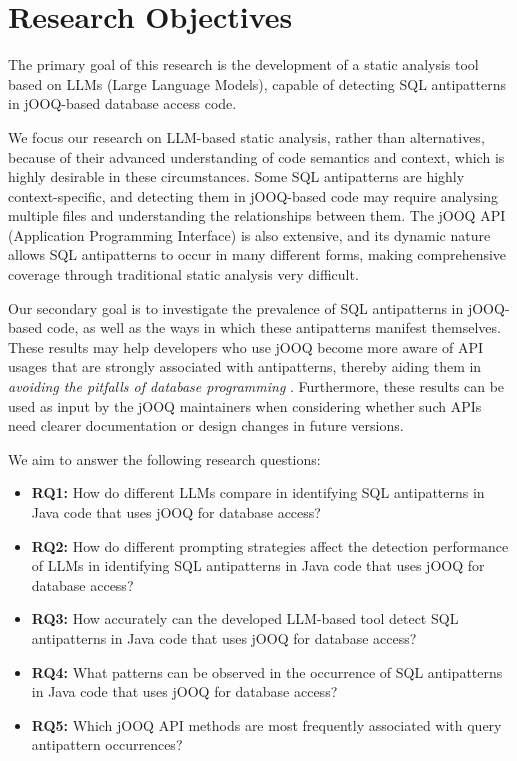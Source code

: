 \section{Research Objectives}\label{sec:objectives}

The primary goal of this research is the development of a static analysis tool based on LLMs (Large Language Models), capable of detecting SQL antipatterns in jOOQ-based database access code.

We focus our research on LLM-based static analysis, rather than alternatives, because of their advanced understanding of code semantics and context, which is highly desirable in these circumstances. Some SQL antipatterns are highly context-specific, and detecting them in jOOQ-based code may require analysing multiple files and understanding the relationships between them. The jOOQ API (Application Programming Interface) is also extensive, and its dynamic nature allows SQL antipatterns to occur in many different forms, making comprehensive coverage through traditional static analysis very difficult.

Our secondary goal is to investigate the prevalence of SQL antipatterns in jOOQ-based code, as well as the ways in which these antipatterns manifest themselves. These results may help developers who use jOOQ become more aware of API usages that are strongly associated with antipatterns, thereby aiding them in \textit{avoiding the pitfalls of database programming} . Furthermore, these results can be used as input by the jOOQ maintainers when considering whether such APIs need clearer documentation or design changes in future versions.

We aim to answer the following research questions:

\begin{itemize}
    \item \textbf{RQ1:} How do different LLMs compare in identifying SQL antipatterns in Java code that uses jOOQ for database access?
    \item \textbf{RQ2:} How do different prompting strategies affect the detection performance of LLMs in identifying SQL antipatterns in Java code that uses jOOQ for database access?
    \item \textbf{RQ3:} How accurately can the developed LLM-based tool detect SQL antipatterns in Java code that uses jOOQ for database access?
    \item \textbf{RQ4:} What patterns can be observed in the occurrence of SQL antipatterns in Java code that uses jOOQ for database access?
    \item \textbf{RQ5:} Which jOOQ API methods are most frequently associated with query antipattern occurrences?
\end{itemize}


